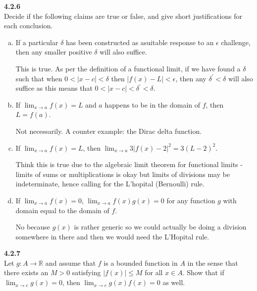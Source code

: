 \textbf{4.2.6}
\\

Decide if the following claims are true or false, and give short justifications for each conclusion.

\begin{enumerate}[(a)]
\item If a particular $\delta$ has been constructed as asuitable response to an $\epsilon$ challenge, then any smaller positive
$\delta$ will also suffice.

This is true. As per the definition of a functional limit, if we have found a $\delta$ such that when $0 < |x-c| < \delta$
then $|f(x) - L|<\epsilon$, then any $\delta^\prime < \delta$ will also suffice as this means that
$0 < |x-c| < \delta^\prime < \delta$.


\item If $\lim_{x\rightarrow a} f(x) = L$ and $a$ happens to be in the domain of $f$, then $L = f(a)$.

Not necessarily.
A counter example: the Dirac delta function.

\item If $\lim_{x\rightarrow a} f(x) = L$, then $\lim_{x\rightarrow a} 3|f(x) - 2|^2 = 3(L-2)^2$.

Think this is true due to the algebraic limit theorem for functional limits -
limits of sums or multiplications is okay but limits of divisions
may be indeterminate, hence calling for the L'hopital (Bernoulli) rule.

\item If $\lim_{x\rightarrow a} f(x) = 0$, $\lim_{x\rightarrow a} f(x)g(x) = 0$ for any function $g$ with domain equal to the
domain of $f$.

No because $g(x)$ is rather generic so we could actually be doing a division somewhere in there and then we would need the
L'Hopital rule.

\end{enumerate}



\label{abbott:4.2.7}
\textbf{4.2.7}
\\

Let $g : A \rightarrow \mathbb{R}$ and assume that $f$ is a bounded function in $A$
in the sense that there exists an $M > 0$ satisfying $|f(x)| \leq M$ for all $x \in A$.
Show that if $\lim_{x\rightarrow c} g(x) = 0$,
then $\lim_{x\rightarrow c} g(x)f(x) = 0$ as well.
\\

